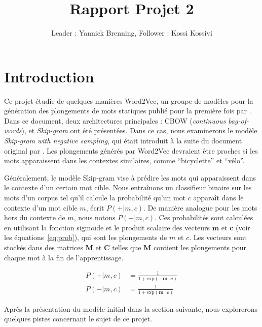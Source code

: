 \documentclass[12pt]{article}
\title{Rapport Projet 2}
\author{Leader : Yannick Brenning, Follower : Kossi Kossivi}
\begin{document}
\maketitle

\vspace{0.5in}

\section{Introduction} \label{introduction}

Ce projet étudie de quelques manières Word2Vec, un groupe de modèles pour la génération des plongements de mots statiques publié pour la première fois par \cite{DBLP:journals/corr/abs-1301-3781}. Dans ce document, deux architectures principales : CBOW (\textit{continuous bag-of-words}), et \textit{Skip-gram} ont été présentées. Dans ce cas, nous examinerons le modèle \textit{Skip-gram with negative sampling}, qui était introduit à la suite du document original par \cite{DBLP:conf/nips/MikolovSCCD13}. Les plongements générés par Word2Vec devraient être proches si les mots apparaissent dans les contextes similaires, comme ``bicyclette'' et ``vélo''.

Généralement, le modèle Skip-gram vise à prédire les mots qui apparaissent dans le contexte d'un certain mot cible. Nous entraînons un classifieur binaire sur les mots d'un corpus tel qu'il calcule la probabilité qu'un mot $c$ apparaît dans le contexte d'un mot cible $m$, écrit $P(+|m, c)$. De manière analogue pour les mots hors du contexte de $m$, nous notons $P(-|m, c)$. Ces probabilités sont calculées en utilisant la fonction sigmo\"\i de et le produit scalaire des vecteurs $\mathbf{m} $ et $ \mathbf{c} $ (voir les équations~\ref{eq:prob}), qui sont les plongements de $m$ et $c$. Les vecteurs sont stockés dans des matrices $\mathbf{M}$ et $\mathbf{C}$ telles que $\mathbf{M}$ contient les plongements pour chaque mot à la fin de l'apprentissage.

\begin{equation}\label{eq:prob}
\begin{split}
    P(+|m, c) & = \frac{1}{1 + \text{exp}(-\mathbf{m} \cdot \mathbf{c})} \\
    P(-|m, c) & = \frac{1}{1 + \text{exp}(\mathbf{m} \cdot \mathbf{c})} 
\end{split}
\end{equation}

Après la présentation du modèle initial dans la section suivante, nous explorerons quelques pistes concernant le sujet de ce projet.
\end{document}

